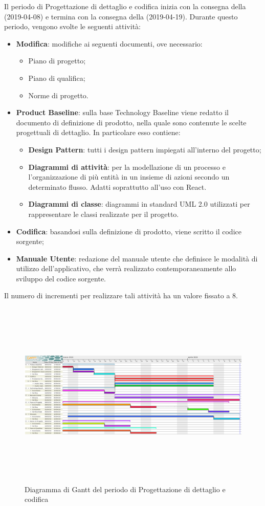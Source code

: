 Il periodo di Progettazione di dettaglio e codifica inizia con la consegna della \RP{} (2019-04-08) e termina con la consegna della \RQ{} (2019-04-19).\newline
Durante questo periodo, vengono svolte le seguenti attività:
\begin{itemize}
	\item \textbf{Modifica}: modifiche ai seguenti documenti, ove necessario:
	\begin{itemize}
		\item Piano di progetto;
		\item Piano di qualifica;
		\item Norme di progetto.
	\end{itemize}
	\item \textbf{Product Baseline}: sulla base Technology Baseline viene redatto il documento di definizione di prodotto, nella quale sono contenute le scelte progettuali di dettaglio. In particolare esso contiene:
	\begin{itemize}
		\item {\textbf{Design Pattern}}: tutti i design pattern impiegati all'interno del progetto;
		\item \textbf{Diagrammi di attività}: per la modellazione di un processo e l'organizzazione di più entità in un insieme di azioni secondo un determinato flusso. Adatti soprattutto all'uso con {React}.
		\item  \textbf{Diagrammi di classe}: diagrammi in standard UML 2.0 utilizzati per rappresentare le classi realizzate per il progetto.
	\end{itemize}
	\item \textbf{Codifica}: basandosi sulla definizione di prodotto, viene scritto il codice sorgente;
	\item \textbf{Manuale Utente}: redazione del manuale utente che definisce le modalità di utilizzo dell'applicativo, che verrà realizzato contemporaneamente allo sviluppo del codice sorgente. 
\end{itemize}
Il numero di incrementi per realizzare tali attività ha un valore fissato a 8.
\begin{figure}[H]
	\centering
	\hspace*{-1.5cm}
	\includegraphics[width=19.4cm, height=9cm]{Pianificazione/progettazioneDettaglioCodifica.pdf}
	\caption{Diagramma di Gantt del periodo di Progettazione di dettaglio e codifica}
\end{figure}